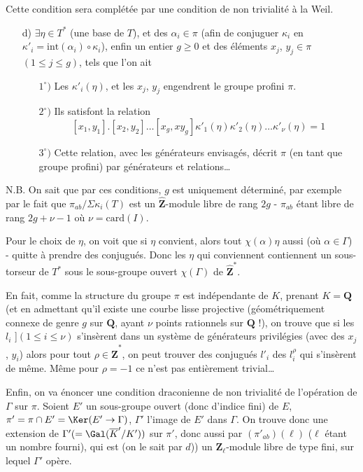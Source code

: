 Cette condition sera complétée par une condition de non trivialité à la Weil.
\begin{enumerate}    
    \item[d)] $\exists \eta \in T^*$ (une base de $T$), et des $\alpha_i \in \pi$ (afin de conjuguer $\kappa_i$ en $\kappa'_i = \text{int}(\alpha_i) \circ \kappa_i$), enfin un entier $g \geq 0$ et des éléments $x_j$, $y_j \in \pi$ $(1 \leq j \leq g)$, tels que l'on ait 
    \begin{enumerate}    
    \item[$1^\circ)$] Les $\kappa'_i(\eta)$, et les $x_j$, $y_j$ engendrent le groupe profini $\pi$.
    \item[$2^\circ)$] Ils satisfont la relation 
    $$
    \boxed{[x_1, y_1].[x_2, y_2]\dots[x_g, xy_g]\kappa'_1(\eta)\kappa'_2(\eta)\dots\kappa'_{\nu}(\eta) = 1}
    $$
    \item[$3^\circ)$] Cette relation, avec les générateurs envisagés, décrit $\pi$ (en tant que groupe profini) par générateurs et relations\dots
\end{enumerate}
\end{enumerate}
 N.B. On sait que par ces conditions, $g$ est uniquement déterminé, par exemple par le fait que $\pi_{ab}/\Sigma \kappa_i(T)$ est un $\widehat{\mathbf{Z}}$-module libre de rang $2g$ - $\pi_{ab}$ étant libre de rang $2g + \nu -1$ où $\nu = \text{card}(I)$.
 
 Pour le choix de $\eta$, on voit que si $\eta$ convient, alors tout $\chi(\alpha)\eta$ aussi (où $\alpha \in \Gamma$) - quitte à prendre des conjugués. Donc les $\eta$ qui conviennent contiennent un sous-torseur de $T^*$ sous le sous-groupe ouvert $\chi(\Gamma)$ de $\widehat{\mathbf{Z}}^*$.
 
 En fait, comme la structure du groupe $\pi$ est indépendante de $K$, prenant $K = \mathbf{Q}$ (et en admettant qu'il existe une courbe lisse projective (géométriquement connexe de genre $g$ sur $\mathbf{Q}$, ayant $\nu$ points rationnels sur $\mathbf{Q}$ !), on trouve que si les $l_i$ ]$(1 \leq i \leq \nu)$ s'insèrent dans un système de générateurs privilégies (avec des $x_j$, $y_i$) alors pour tout $\rho \in \widehat{\mathbf{Z}}^*$, on peut trouver des conjugués $l'_i$ des $l^{\rho}_i$ qui s'insèrent de même. Même pour $\rho = -1$ ce n'est pas entièrement trivial\dots 
 
 Enfin, on va énoncer une condition draconienne de non trivialité de l'opération de $\Gamma$ sur $\pi$. Soient $E'$ un sous-groupe ouvert (donc d'indice fini) de $E$, $\pi' = \pi \cap E' = \Ker(E' \to \Gamma)$, $\Gamma'$ l'image de $E'$ dans $\Gamma$. On trouve donc une extension de $\Gamma' (= \Gal(\overline{K}'/K'))$ sur $\pi'$, donc aussi par $(\pi'_{ab})(\ell)$ ($\ell$ étant un nombre fourni), qui est (on le sait par $d$)) un $\mathbf{Z}_{\ell}$-module libre de type fini, sur lequel $\Gamma'$ opère.
 
